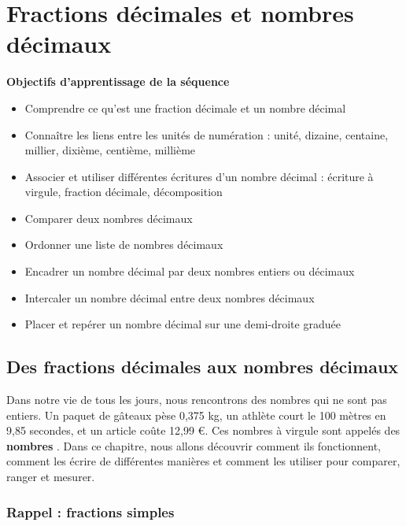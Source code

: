 \chapter{Fractions décimales et nombres décimaux}

\begin{objectifsbox}
	\textbf{Objectifs d'apprentissage de la séquence}
	\begin{itemize}
		\item Comprendre ce qu'est une fraction décimale et un nombre décimal
		\item Connaître les liens entre les unités de numération : unité, dizaine, centaine, millier, dixième, centième, millième
		\item Associer et utiliser différentes écritures d'un nombre décimal : écriture à virgule, fraction décimale, décomposition
		\item Comparer deux nombres décimaux
		\item Ordonner une liste de nombres décimaux
		\item Encadrer un nombre décimal par deux nombres entiers ou décimaux
		\item Intercaler un nombre décimal entre deux nombres décimaux
		\item Placer et repérer un nombre décimal sur une demi-droite graduée
	\end{itemize}
\end{objectifsbox}

\section{Des fractions décimales aux nombres décimaux}

Dans notre vie de tous les jours, nous rencontrons des nombres qui ne sont pas entiers.
Un paquet de gâteaux pèse 0,375 kg, un athlète court le 100 mètres en 9,85 secondes, et un article coûte 12,99 €.
Ces nombres à virgule sont appelés des \textbf{nombres }. Dans ce chapitre, nous allons découvrir comment ils fonctionnent, comment les écrire de différentes manières et comment les utiliser pour comparer, ranger et mesurer.
\subsection{Rappel : fractions simples}

